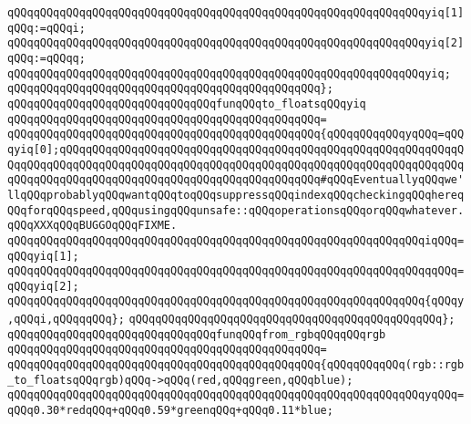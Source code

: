 \verb|qQQqqQQqqQQqqQQqqQQqqQQqqQQqqQQqqQQqqQQqqQQqqQQqqQQqqQQqqQQqqQQqyiq[1]qQQq:=qQQqi;|\newline
\verb|qQQqqQQqqQQqqQQqqQQqqQQqqQQqqQQqqQQqqQQqqQQqqQQqqQQqqQQqqQQqqQQqyiq[2]qQQq:=qQQqq;|\newline
\newline
\verb|qQQqqQQqqQQqqQQqqQQqqQQqqQQqqQQqqQQqqQQqqQQqqQQqqQQqqQQqqQQqqQQqyiq;|\newline
\verb|qQQqqQQqqQQqqQQqqQQqqQQqqQQqqQQqqQQqqQQqqQQqqQQq};|\newline
\newline
\verb|qQQqqQQqqQQqqQQqqQQqqQQqqQQqqQQqfunqQQqto_floatsqQQqyiq|\newline
\verb|qQQqqQQqqQQqqQQqqQQqqQQqqQQqqQQqqQQqqQQqqQQqqQQq=|\newline
\verb|qQQqqQQqqQQqqQQqqQQqqQQqqQQqqQQqqQQqqQQqqQQqqQQq{qQQqqQQqqQQqyqQQq=qQQqyiq[0];qQQqqQQqqQQqqQQqqQQqqQQqqQQqqQQqqQQqqQQqqQQqqQQqqQQqqQQqqQQqqQQqqQQqqQQqqQQqqQQqqQQqqQQqqQQqqQQqqQQqqQQqqQQqqQQqqQQqqQQqqQQqqQQqqQQqqQQqqQQqqQQqqQQqqQQqqQQqqQQqqQQqqQQqqQQqqQQqqQQq#qQQqEventuallyqQQqwe'llqQQqprobablyqQQqwantqQQqtoqQQqsuppressqQQqindexqQQqcheckingqQQqhereqQQqforqQQqspeed,qQQqusingqQQqunsafe::qQQqoperationsqQQqorqQQqwhatever.qQQqXXXqQQqBUGGOqQQqFIXME.|\newline
\verb|qQQqqQQqqQQqqQQqqQQqqQQqqQQqqQQqqQQqqQQqqQQqqQQqqQQqqQQqqQQqqQQqiqQQq=qQQqyiq[1];|\newline
\verb|qQQqqQQqqQQqqQQqqQQqqQQqqQQqqQQqqQQqqQQqqQQqqQQqqQQqqQQqqQQqqQQqqqQQq=qQQqyiq[2];|\newline
\newline
\verb|qQQqqQQqqQQqqQQqqQQqqQQqqQQqqQQqqQQqqQQqqQQqqQQqqQQqqQQqqQQqqQQq{qQQqy,qQQqi,qQQqqqQQq};|\newline
\verb|qQQqqQQqqQQqqQQqqQQqqQQqqQQqqQQqqQQqqQQqqQQqqQQq};|\newline
\newline
\newline
\verb|qQQqqQQqqQQqqQQqqQQqqQQqqQQqqQQqfunqQQqfrom_rgbqQQqqQQqrgb|\newline
\verb|qQQqqQQqqQQqqQQqqQQqqQQqqQQqqQQqqQQqqQQqqQQqqQQq=|\newline
\verb|qQQqqQQqqQQqqQQqqQQqqQQqqQQqqQQqqQQqqQQqqQQqqQQq{qQQqqQQqqQQq(rgb::rgb_to_floatsqQQqrgb)qQQq->qQQq(red,qQQqgreen,qQQqblue);|\newline
\newline
\verb|qQQqqQQqqQQqqQQqqQQqqQQqqQQqqQQqqQQqqQQqqQQqqQQqqQQqqQQqqQQqqQQqyqQQq=qQQq0.30*redqQQq+qQQq0.59*greenqQQq+qQQq0.11*blue;|\newline
